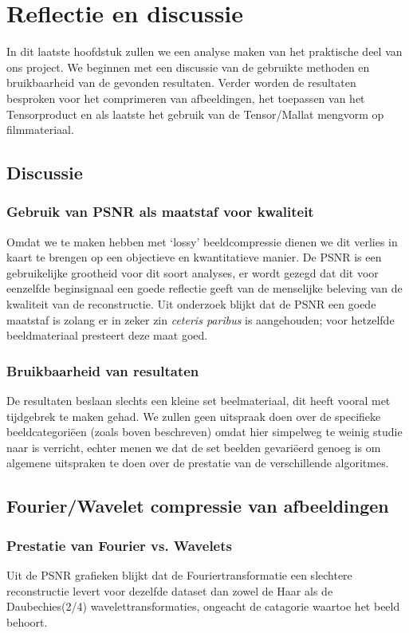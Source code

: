 \chapter{Reflectie en discussie}
In dit laatste hoofdstuk zullen we een analyse maken van het praktische deel van ons project.
We beginnen met een discussie van de gebruikte methoden en bruikbaarheid van de gevonden resultaten.
Verder worden de resultaten besproken voor het comprimeren van afbeeldingen, het toepassen van het 
Tensorproduct en als laatste het gebruik van de Tensor/Mallat mengvorm op filmmateriaal. 

\section{Discussie}
\subsection{Gebruik van PSNR als maatstaf voor kwaliteit}
Omdat we te maken hebben met `lossy' beeldcompressie dienen we dit verlies in kaart te brengen op een 
objectieve en kwantitatieve manier. 
De PSNR is een gebruikelijke grootheid voor dit soort analyses, er wordt gezegd dat dit voor eenzelfde 
beginsignaal een goede reflectie geeft van de menselijke beleving van de kwaliteit van de reconstructie.
Uit onderzoek\cite{PSNR} blijkt dat de PSNR een goede maatstaf is zolang er in zeker zin \emph{ceteris paribus}
is aangehouden; voor hetzelfde beeldmateriaal presteert deze maat goed.

\subsection{Bruikbaarheid van resultaten}

De resultaten beslaan slechts een kleine set beelmateriaal, dit heeft vooral met tijdgebrek te maken gehad.
We zullen geen uitspraak doen over de specifieke beeldcategori\"een (zoals boven beschreven) 
omdat hier simpelweg te weinig studie naar is verricht, echter menen we dat de set beelden gevari\"eerd 
genoeg is om algemene uitspraken te doen over de prestatie van de verschillende algoritmes.

\section{Fourier/Wavelet compressie van afbeeldingen}

\subsection{Prestatie van Fourier vs. Wavelets}
Uit de PSNR grafieken blijkt dat de Fouriertransformatie een slechtere reconstructie levert voor 
dezelfde dataset dan zowel de Haar als de Daubechies(2/4) wavelettransformaties, 
ongeacht de catagorie waartoe het beeld behoort.

